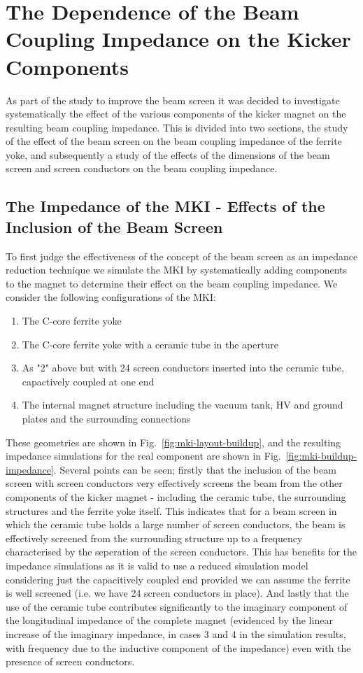 \section{The Dependence of the Beam Coupling Impedance on the Kicker Components}

As part of the study to improve the beam screen it was decided to investigate systematically the effect of the various components of the kicker magnet on the resulting beam coupling impedance. This is divided into two sections, the study of the effect of the beam screen on the beam coupling impedance of the ferrite yoke, and subsequently a study of the effects of the dimensions of the beam screen and screen conductors on the beam coupling impedance.

\subsection{The Impedance of the MKI - Effects of the Inclusion of the Beam Screen}

To first judge the effectiveness of the concept of the beam screen as an impedance reduction technique we simulate the MKI by systematically adding components to the magnet to determine their effect on the beam coupling impedance. We consider the following configurations of the MKI:

\begin{enumerate}
\item{The C-core ferrite yoke}
\item{The C-core ferrite yoke with a ceramic tube in the aperture}
\item{As "2" above but with 24 screen conductors inserted into the ceramic tube, capactively coupled at one end}
\item{The internal magnet structure including the vacuum tank, HV and ground plates and the surrounding connections}
\end{enumerate}

These geometries are shown in Fig.~\ref{fig:mki-layout-buildup}, and the resulting impedance simulations for the real component are shown in Fig.~\ref{fig:mki-buildup-impedance}. Several points can be seen; firstly that the inclusion of the beam screen with screen conductors very effectively screens the beam from the other components of the kicker magnet - including the ceramic tube, the surrounding structures and the ferrite yoke itself. This indicates that for a beam screen in which the ceramic tube holds a large number of screen conductors, the beam is effectively screened from the surrounding structure up to a frequency characterised by the seperation of the screen conductors. This has benefits for the impedance simulations as it is valid to use a reduced simulation model considering just the capacitively coupled end provided we can assume the ferrite is well screened (i.e. we have 24 screen conductors in place). And lastly that the use of the ceramic tube contributes significantly to the imaginary component of the longitudinal impedance of the complete magnet (evidenced by the linear increase of the imaginary impedance, in cases 3 and 4 in the simulation results, with frequency due to the inductive component of the impedance) even with the presence of screen conductors.
 
